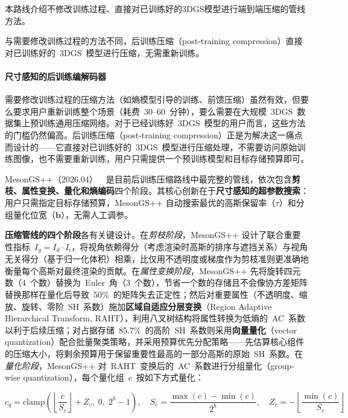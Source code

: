 本路线介绍不修改训练过程、直接对已训练好的3DGS模型进行端到端压缩的管线方法。

与需要修改训练过程的方法不同，后训练压缩（post-training compression）直接对已训练好的~3DGS~模型进行压缩，无需重新训练。

\paragraph{尺寸感知的后训练编解码器}

需要修改训练过程的压缩方法（如熵模型引导的训练、前馈压缩）虽然有效，但要么要求用户重新训练整个场景（耗费~30--60~分钟），要么需要在大规模~3DGS~数据集上预训练通用压缩网络。对于已经训练好~3DGS~模型的用户而言，这些方法的门槛仍然偏高。后训练压缩（post-training compression）正是为解决这一痛点而设计的——它直接对已训练好的~3DGS~模型进行压缩处理，不需要访问原始训练图像，也不需要重新训练，用户只需提供一个预训练模型和目标存储预算即可。

MesonGS++（2026.04）~\cite{2604_26799}~是目前后训练压缩路线中最完整的管线，依次包含\textbf{剪枝、属性变换、量化和熵编码}四个阶段。其核心创新在于\textbf{尺寸感知的超参数搜索}：用户只需指定目标存储预算，MesonGS++ 自动搜索最优的高斯保留率（$\tau$）和分组量化位宽（$\mathbf{b}$），无需人工调参。

\textbf{压缩管线的四个阶段}各有关键设计。在\emph{剪枝阶段}，MesonGS++ 设计了联合重要性指标~$I_g = I_d \cdot I_i$，将视角依赖得分（考虑渲染时高斯的排序与遮挡关系）与视角无关得分（基于归一化体积）相乘，比仅用不透明度或梯度作为剪枝准则更准确地衡量每个高斯对最终渲染的贡献。在\emph{属性变换阶段}，MesonGS++ 先将旋转四元数（4~个数）替换为~Euler~角（3~个数），节省一个数的存储且不会像协方差矩阵替换那样在量化后导致~50\%~的矩阵失去正定性；然后对重要属性（不透明度、缩放、旋转、零阶~SH~系数）施加\textbf{区域自适应分层变换}（Region Adaptive Hierarchical Transform, RAHT），利用八叉树结构将属性转换为低熵的~AC~系数以利于后续压缩；对占据存储~85.7\%~的高阶~SH~系数则采用\textbf{向量量化}（vector quantization）配合批量聚类策略，并采用预算优先分配策略——先估算核心组件的压缩大小，将剩余预算用于保留重要性最高的一部分高斯的原始~SH~系数。在\emph{量化阶段}，MesonGS++ 对~RAHT~变换后的~AC~系数进行分组量化（group-wise quantization），每个量化组~$c$~按如下方式量化：

\begin{equation}
c_q = \text{clamp}\!\left(\left\lfloor \frac{c}{S_c} \right\rfloor + Z_c,\; 0,\; 2^b - 1\right), \quad S_c = \frac{\max(c) - \min(c)}{2^b}, \quad Z_c = -\left\lfloor \frac{\min(c)}{S_c} \right\rfloor
\end{equation}

